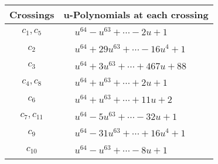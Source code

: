 \documentclass[1p]{elsarticle_modified}
\theoremstyle{definition}
\begin{document}
\begin{tabular}{m{50pt}|m{274pt}}
Crossings & \hspace{64pt}u-Polynomials at each crossing \\
\hline $$\begin{aligned}c_{1},c_{5}\end{aligned}$$&$\begin{aligned}
&u^{64}- u^{63}+\cdots-2 u+1
\end{aligned}$\\
\hline $$\begin{aligned}c_{2}\end{aligned}$$&$\begin{aligned}
&u^{64}+29 u^{63}+\cdots-16 u^4+1
\end{aligned}$\\
\hline $$\begin{aligned}c_{3}\end{aligned}$$&$\begin{aligned}
&u^{64}+3 u^{63}+\cdots+467 u+88
\end{aligned}$\\
\hline $$\begin{aligned}c_{4},c_{8}\end{aligned}$$&$\begin{aligned}
&u^{64}+u^{63}+\cdots+2 u+1
\end{aligned}$\\
\hline $$\begin{aligned}c_{6}\end{aligned}$$&$\begin{aligned}
&u^{64}+u^{63}+\cdots+11 u+2
\end{aligned}$\\
\hline $$\begin{aligned}c_{7},c_{11}\end{aligned}$$&$\begin{aligned}
&u^{64}-5 u^{63}+\cdots-32 u+1
\end{aligned}$\\
\hline $$\begin{aligned}c_{9}\end{aligned}$$&$\begin{aligned}
&u^{64}-31 u^{63}+\cdots+16 u^4+1
\end{aligned}$\\
\hline $$\begin{aligned}c_{10}\end{aligned}$$&$\begin{aligned}
&u^{64}- u^{63}+\cdots-8 u+1
\end{aligned}$\\
\hline
\end{tabular}\newpage\renewcommand{\arraystretch}{1}
\end{document}
